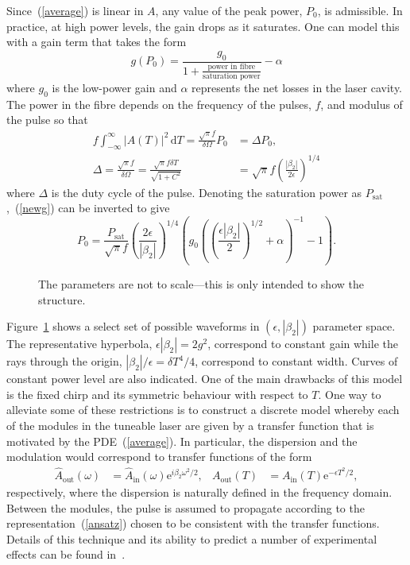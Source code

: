 \documentclass[%
 aps,
 jmp,%
 amsmath,amssymb,
 reprint,%
nofootinbib
]{revtex4-1}
\providecommand{\df}{\textrm{d}}
\begin{document}
Since~(\ref{average}) is linear in $A$, any value of the peak power, $P_0$, is admissible. In practice, at high power levels, the gain drops as it saturates. One can model this with a gain term that takes the form
\begin{equation}
\label{newg}
	g(P_0) = \frac{g_0}{1+\frac{\textrm{power in fibre}}{\textrm{saturation power}}} - \alpha
\end{equation}
where $g_0$ is the low-power gain and $\alpha$ represents the net losses in the laser cavity. The power in the fibre depends on the frequency of the pulses, $f$, and modulus of the pulse so that
\begin{align*}
	f \int_{-\infty}^\infty |A(T)|^2\, \df T =
	\frac{\sqrt{\pi}f}{\delta\Omega}P_0 &= \Delta P_0, \\
	\Delta = \frac{\sqrt{\pi}f}{\delta\Omega} = \frac{\sqrt{\pi}f\delta T}{\sqrt{1+C^2}}&=
	\sqrt{\pi}f \left(\frac{|\beta_2|}{2\epsilon}\right)^{1/4}
\end{align*}
where $\Delta$ is the duty cycle of the pulse. Denoting the saturation power as $P_{\textrm{sat}}$,~(\ref{newg}) can be inverted to give
\[
	P_0 = \frac{P_{\textrm{sat}}}{\sqrt{\pi}f} \left(\frac{2\epsilon}{|\beta_2|}\right)^{1/4}
	\left(g_0\left(\left(\frac{\epsilon|\beta_2|}{2}\right)^{1/2} + \alpha\right)^{-1} - 1\right).
\]

\begin{figure}[tbp]
\centering

\caption{The parameters are not to scale---this is only intended to show the structure.}
\label{fig:average}
\end{figure}

Figure~\ref{fig:average} shows a select set of possible waveforms in $(\epsilon,|\beta_2|)$ parameter space. The representative hyperbola, $\epsilon|\beta_2| = 2g^2$, correspond to constant gain while the rays through the origin, $|\beta_2|/\epsilon = \delta T^4/4$, correspond to constant width. Curves of constant power level are also indicated. One of the main drawbacks of this model is the fixed chirp and its symmetric behaviour with respect to $T$. One way to alleviate some of these restrictions is to construct a discrete model whereby each of the modules in the tuneable laser are given by a transfer function that is motivated by the PDE~(\ref{average}). In particular, the dispersion and the modulation would correspond to transfer functions of the form
\begin{align*}
	\widehat{A}_{\textrm{out}}(\omega) &= \widehat{A}_{\textrm{in}}(\omega)\textrm{e}^{i\beta_2\omega^2/2},&
	A_{\textrm{out}}(T) &= A_{\textrm{in}}(T)\textrm{e}^{-\epsilon T^2/2},
\end{align*}
respectively, where the dispersion is naturally defined in the frequency domain. Between the modules, the pulse is assumed to propagate according to the representation~(\ref{ansatz}) chosen to be consistent with the transfer functions. Details of this technique and its ability to predict a number of experimental effects can be found in~\cite{burgoyne2014}.
\end{document}
